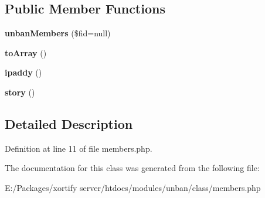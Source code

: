 \subsection*{Public Member Functions}
\begin{DoxyCompactItemize}
\item 
\hypertarget{classunban_members_a3c5b5792499578afbc7f2bb53df0bbed}{{\bfseries unban\-Members} (\$fid=null)}\label{classunban_members_a3c5b5792499578afbc7f2bb53df0bbed}

\item 
\hypertarget{classunban_members_a658defb34762c8f40085aec87e16ba1a}{{\bfseries to\-Array} ()}\label{classunban_members_a658defb34762c8f40085aec87e16ba1a}

\item 
\hypertarget{classunban_members_a9806a032ce31e96ccd75cd6d61a8e656}{{\bfseries ipaddy} ()}\label{classunban_members_a9806a032ce31e96ccd75cd6d61a8e656}

\item 
\hypertarget{classunban_members_abd3045226e27a02dff5dbdcbfc8b5b7c}{{\bfseries story} ()}\label{classunban_members_abd3045226e27a02dff5dbdcbfc8b5b7c}

\end{DoxyCompactItemize}


\subsection{Detailed Description}


Definition at line 11 of file members.\-php.



The documentation for this class was generated from the following file\-:\begin{DoxyCompactItemize}
\item 
E\-:/\-Packages/xortify server/htdocs/modules/unban/class/members.\-php\end{DoxyCompactItemize}
